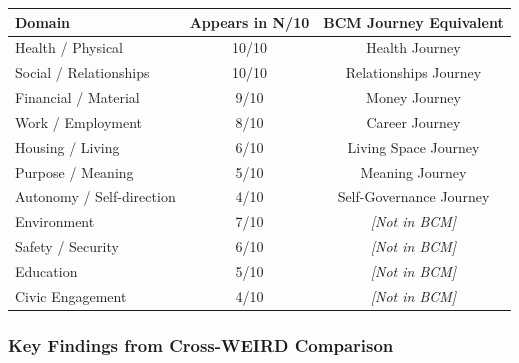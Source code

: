 \begin{center}
\begin{tabular}{@{}lcc@{}}
\toprule
\textbf{Domain} & \textbf{Appears in N/10} & \textbf{BCM Journey Equivalent} \\
\midrule
Health / Physical & 10/10 & Health Journey \\
Social / Relationships & 10/10 & Relationships Journey \\
Financial / Material & 9/10 & Money Journey \\
Work / Employment & 8/10 & Career Journey \\
Housing / Living & 6/10 & Living Space Journey \\
Purpose / Meaning & 5/10 & Meaning Journey \\
Autonomy / Self-direction & 4/10 & Self-Governance Journey \\
\midrule
Environment & 7/10 & \textit{[Not in BCM]} \\
Safety / Security & 6/10 & \textit{[Not in BCM]} \\
Education & 5/10 & \textit{[Not in BCM]} \\
Civic Engagement & 4/10 & \textit{[Not in BCM]} \\
\bottomrule
\end{tabular}
\end{center}

\subsubsection{Key Findings from Cross-WEIRD Comparison}

